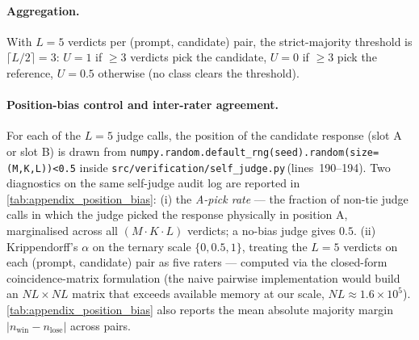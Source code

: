 \paragraph{Aggregation.}
With $L{=}5$ verdicts per (prompt, candidate) pair, the strict-majority
threshold is $\lceil L/2 \rceil = 3$: $U = 1$ if $\geq 3$ verdicts pick
the candidate, $U=0$ if $\geq 3$ pick the reference, $U=0.5$ otherwise
(no class clears the threshold).

\paragraph{Position-bias control and inter-rater agreement.}
For each of the $L=5$ judge calls, the position of the candidate
response (slot A or slot B) is drawn from
\texttt{numpy.random.default\_rng(seed).random(size{=}(M,K,L))<0.5}
inside
\texttt{src/verification/self\_judge.py}\,(lines~190--194).
Two diagnostics on the same self-judge audit log are reported in
\cref{tab:appendix_position_bias}: (i) the \emph{A-pick rate} —
the fraction of non-tie judge calls in which the judge picked the
response physically in position A, marginalised across all
$(M\cdot K\cdot L)$ verdicts; a no-bias judge gives $0.5$. (ii)
Krippendorff's $\alpha$ on the ternary scale $\{0,0.5,1\}$,
treating the $L=5$ verdicts on each (prompt, candidate) pair as
five raters — computed via the closed-form coincidence-matrix
formulation (the naive pairwise implementation would build an
$NL\times NL$ matrix that exceeds available memory at our scale,
$NL\approx 1.6\times10^5$).
\cref{tab:appendix_position_bias} also reports the mean absolute
majority margin $|n_{\text{win}}{-}n_{\text{lose}}|$ across pairs.



